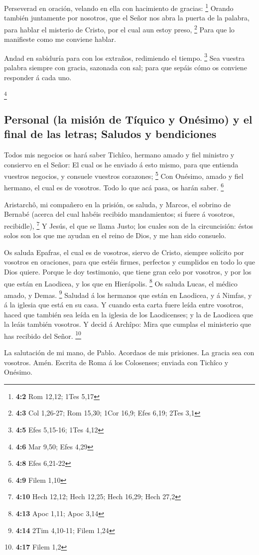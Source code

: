  Perseverad en oración, velando en ella con hacimiento de
gracias: \footnote{\textbf{4:2} Rom 12,12; 1Tes 5,17} 
Orando también juntamente por nosotros, que el Señor nos abra la puerta
de la palabra, para hablar el misterio de Cristo, por el cual aun estoy
preso, \footnote{\textbf{4:3} Col 1,26-27; Rom 15,30; 1Cor 16,9; Efes
  6,19; 2Tes 3,1}  Para que lo manifieste como me conviene
hablar.

 Andad en sabiduría para con los extraños, redimiendo el
tiempo. \footnote{\textbf{4:5} Efes 5,15-16; 1Tes 4,12} 
Sea vuestra palabra siempre con gracia, sazonada con sal; para que
sepáis cómo os conviene responder á cada uno.

\footnote{\textbf{4:6} Mar 9,50; Efes 4,29}

\hypertarget{personal-la-misiuxf3n-de-tuxedquico-y-onuxe9simo-y-el-final-de-las-letras-saludos-y-bendiciones}{%
\subsection{Personal (la misión de Tíquico y Onésimo) y el final de las
letras; Saludos y
bendiciones}\label{personal-la-misiuxf3n-de-tuxedquico-y-onuxe9simo-y-el-final-de-las-letras-saludos-y-bendiciones}}

 Todos mis negocios os hará saber Tichîco, hermano amado y
fiel ministro y consiervo en el Señor:  El cual os he
enviado á esto mismo, para que entienda vuestros negocios, y consuele
vuestros corazones; \footnote{\textbf{4:8} Efes 6,21-22} 
Con Onésimo, amado y fiel hermano, el cual es de vosotros. Todo lo que
acá pasa, os harán saber. \footnote{\textbf{4:9} Filem 1,10}

 Aristarchô, mi compañero en la prisión, os saluda, y
Marcos, el sobrino de Bernabé (acerca del cual habéis recibido
mandamientos; si fuere á vosotros, recibidle), \footnote{\textbf{4:10}
  Hech 12,12; Hech 12,25; Hech 16,29; Hech 27,2}  Y
Jesús, el que se llama Justo; los cuales son de la circuncisión: éstos
solos son los que me ayudan en el reino de Dios, y me han sido consuelo.

 Os saluda Epafras, el cual es de vosotros, siervo de
Cristo, siempre solícito por vosotros en oraciones, para que estéis
firmes, perfectos y cumplidos en todo lo que Dios quiere.
 Porque le doy testimonio, que tiene gran celo por
vosotros, y por los que están en Laodicea, y los que en Hierápolis.
\footnote{\textbf{4:13} Apoc 1,11; Apoc 3,14}  Os saluda
Lucas, el médico amado, y Demas. \footnote{\textbf{4:14} 2Tim 4,10-11;
  Filem 1,24}  Saludad á los hermanos que están en
Laodicea, y á Nimfas, y á la iglesia que está en su casa.
 Y cuando esta carta fuere leída entre vosotros, haced
que también sea leída en la iglesia de los Laodicenses; y la de Laodicea
que la leáis también vosotros.  Y decid á Archîpo: Mira
que cumplas el ministerio que has recibido del Señor. \footnote{\textbf{4:17}
  Filem 1,2}

 La salutación de mi mano, de Pablo. Acordaos de mis
prisiones. La gracia sea con vosotros. Amén. Escrita de Roma á los
Colosenses; enviada con Tichîco y Onésimo.
